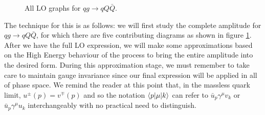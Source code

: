 \begin{figure}[t]
\caption{All LO graphs for $qg \to qQ\bar{Q}$.}
\label{fig:qg_qQQ_graphs}
\end{figure}

The technique for this is as follows: we will first study the complete amplitude for $qg \to qQ\bar{Q}$, for which there are five contributing diagrams as shown in figure \ref{fig:qg_qQQ_graphs}. After we have the full LO expression, we will make some approximations based on the High Energy behaviour of the process to bring the entire amplitude into the desired form. During this approximation stage, we must remember to take care to maintain gauge invariance since our final expression will be applied in all of phase space. We remind the reader at this point that, in the massless quark limit, $u^\pm(p) = v^\mp(p)$ and so the notation $\mathinner{\langle p\vert\mu\vert k\rangle}_{}$ can refer to $\bar{u}_p \gamma^\mu v_k$ or $\bar{u}_p \gamma^\mu u_k$ interchangeably with no practical need to distinguish. 

